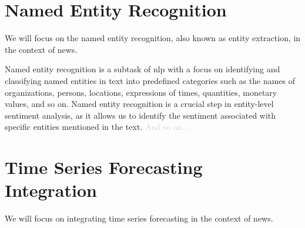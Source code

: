\section{Named Entity Recognition}
\label{sec:named-entity-recognition}
We will focus on the named entity recognition, also known as entity extraction, in the context of news. 

Named entity recognition is a subtask of \acrshort{nlp} with a focus on identifying and classifying named entities in text into predefined categories such as the names of organizations, persons, locations, expressions of times, quantities, monetary values, and so on. Named entity recognition is a crucial step in entity-level sentiment analysis, as it allows us to identify the sentiment associated with specific entities mentioned in the text. \textcolor{lightgray}{And so on...} %

\section{Time Series Forecasting Integration}
\label{sec:integration-with-time-series-forecasting-for-market-trends}
We will focus on integrating time series forecasting in the context of news.

